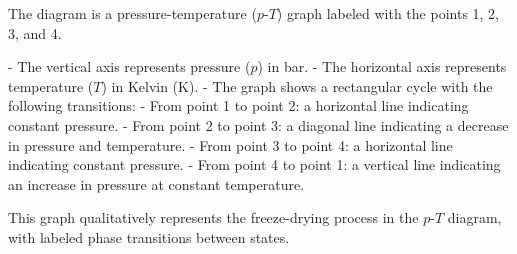 The diagram is a pressure-temperature (\( p \)-\( T \)) graph labeled with the points 1, 2, 3, and 4.  

- The vertical axis represents pressure (\( p \)) in bar.  
- The horizontal axis represents temperature (\( T \)) in Kelvin (\( \text{K} \)).  
- The graph shows a rectangular cycle with the following transitions:  
  - From point 1 to point 2: a horizontal line indicating constant pressure.  
  - From point 2 to point 3: a diagonal line indicating a decrease in pressure and temperature.  
  - From point 3 to point 4: a horizontal line indicating constant pressure.  
  - From point 4 to point 1: a vertical line indicating an increase in pressure at constant temperature.  

This graph qualitatively represents the freeze-drying process in the \( p \)-\( T \) diagram, with labeled phase transitions between states.